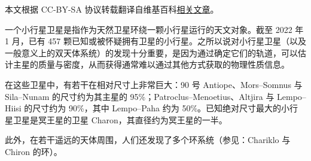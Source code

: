 
本文根据 CC-BY-SA 协议转载翻译自维基百科\href{https://en.wikipedia.org/wiki/Minor-planet_moon}{相关文章}。

一个小行星卫星是指作为天然卫星环绕一颗小行星运行的天文对象。截至 2022 年 1 月，已有 457 颗已知或被怀疑拥有卫星的小行星。之所以说对小行星卫星（以及一般意义上的双天体系统）的发现十分重要，是因为通过确定它们的轨道，可以估计主星的质量与密度，从而获得通常难以通过其他方式获取的物理性质信息。

在这些卫星中，有若干在相对尺寸上非常巨大：90 号 Antiope、Mors–Somnus 与 Sila–Nunam 的尺寸约为其主星的 95\%；Patroclus–Menoetius、Altjira 与 Lempo–Hiisi 的尺寸约为 90\%，其中 Lempo–Paha 约为 50\%。已知绝对尺寸最大的小行星卫星是冥王星的卫星 Charon，其直径约为冥王星的一半。

此外，在若干遥远的天体周围，人们还发现了多个环系统（参见：Chariklo 与 Chiron 的环）。
